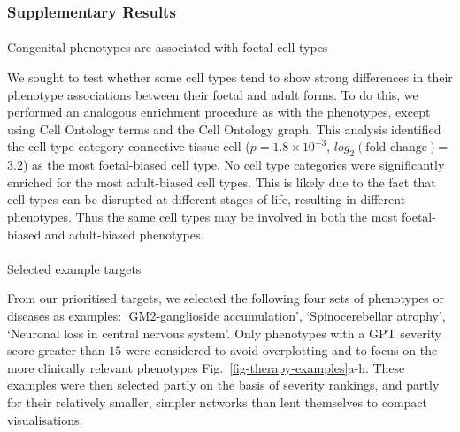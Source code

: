 \documentclass[
]{article}
\makeatletter
\let\oldparagraph\paragraph
\renewcommand{\paragraph}{
    \@ifstar
      \xxxParagraphStar
      \xxxParagraphNoStar
  }
\newcommand{\xxxParagraphStar}[1]{\oldparagraph*{#1}\mbox{}}
\newcommand{\xxxParagraphNoStar}[1]{\oldparagraph{#1}\mbox{}}
\makeatother
\begin{document}
\setcounter{figure}{0}   
\setcounter{table}{0}

\subsubsection{Supplementary Results}\label{supplementary-results}

\paragraph{Congenital phenotypes are associated with foetal cell
types}\label{congenital-phenotypes-are-associated-with-foetal-cell-types-2}

We sought to test whether some cell types tend to show strong
differences in their phenotype associations between their foetal and
adult forms. To do this, we performed an analogous enrichment procedure
as with the phenotypes, except using Cell Ontology terms and the Cell
Ontology graph. This analysis identified the cell type category
connective tissue cell (\(p=\)\(1.8 \times 10^{-3}\),
\(log_2(\text{fold-change})\)=\(3.2\)) as the most foetal-biased cell
type. No cell type categories were significantly enriched for the most
adult-biased cell types. This is likely due to the fact that cell types
can be disrupted at different stages of life, resulting in different
phenotypes. Thus the same cell types may be involved in both the most
foetal-biased and adult-biased phenotypes.

\paragraph{Selected example targets}\label{selected-example-targets-1}

From our prioritised targets, we selected the following four sets of
phenotypes or diseases as examples: `GM2-ganglioside accumulation',
`Spinocerebellar atrophy', `Neuronal loss in central nervous system'.
Only phenotypes with a GPT severity score greater than \(15\) were
considered to avoid overplotting and to focus on the more clinically
relevant phenotypes Fig.~\ref{fig-therapy-examples}a-h. These examples
were then selected partly on the basis of severity rankings, and partly
for their relatively smaller, simpler networks than lent themselves to
compact visualisations.
\end{document}

